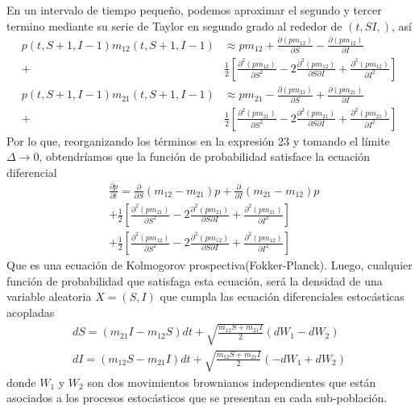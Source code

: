 \documentclass{article}
\begin{document}
\noindent
En un intervalo de tiempo pequeño, podemos aproximar el segundo y tercer termino mediante su serie de Taylor en segundo grado al rededor de $(t,SI,)$, así
\begin{equation}
\begin{aligned}
p(t,S+1,I-1)m_{12}(t,S+1,I-1)
&\approx p m_{12}+\frac{\partial\left(p m_{12}\right)}{\partial S} -\frac{\partial\left(p m_{12}\right)}{\partial I} \\
+&\frac{1}{2} \left[\frac{\partial^2(p m_{12})}{\partial S^2}-2\frac{\partial^2(p m_{12})}{\partial S \partial I}+\frac{\partial^2(p m_{12})}{\partial I^2}\right]
\end{aligned}
\end{equation}
\begin{equation}
\begin{aligned}
p(t,S+1,I-1)m_{21}(t,S+1,I-1)
&\approx p m_{21}-\frac{\partial\left(p m_{21}\right)}{\partial S} +\frac{\partial\left(p m_{21}\right)}{\partial I} \\
+&\frac{1}{2} \left[\frac{\partial^2(p m_{21})}{\partial S^2}-2\frac{\partial^2(p m_{21})}{\partial S \partial I}+\frac{\partial^2(p m_{21})}{\partial I^2}\right]
\end{aligned}
\end{equation}
Por lo que, reorganizando los términos en la expresión 23 y tomando el límite $\Delta \to 0$, obtendríamos que la función de probabilidad satisface la ecuación diferencial 
\begin{equation}
\begin{aligned}
&\frac{\partial p}{\partial t}=\frac{\partial}{\partial S}(m_{12}-m_{21})p+\frac{\partial}{\partial I}(m_{21}-m_{12})p\\
&+\frac{1}{2} \left[\frac{\partial^2(p m_{21})}{\partial S^2}-2\frac{\partial^2(p m_{21})}{\partial S \partial I}+\frac{\partial^2(p m_{21})}{\partial I^2}\right]\\
&+\frac{1}{2} \left[\frac{\partial^2(p m_{12})}{\partial S^2}-2\frac{\partial^2(p m_{12})}{\partial S \partial I}+\frac{\partial^2(p m_{12})}{\partial I^2}\right]
\end{aligned}
\end{equation}
\noindent
Que es una ecuación de Kolmogorov prospectiva(Fokker-Planck). Luego, cualquier función de probabilidad que satisfaga esta ecuación, será la densidad de una variable aleatoria $X=(S,I)$ que cumpla las ecuación diferenciales estocásticas acopladas
\begin{equation}
    \begin{aligned}
    dS=(m_{21}I-m_{12}S)dt+\sqrt{\frac{m_{12}S+m_{21}I}{2}}(dW_1-dW_2)\\
    dI=(m_{12}S-m_{21}I)dt+\sqrt{\frac{m_{12}S+m_{21}I}{2}}(-dW_1+dW_2)
    \end{aligned}
\end{equation}
donde $W_1$ y $W_2$ son dos movimientos brownianos independientes que están asociados a los procesos estocásticos que se presentan en cada sub-población.\\
\end{document}
